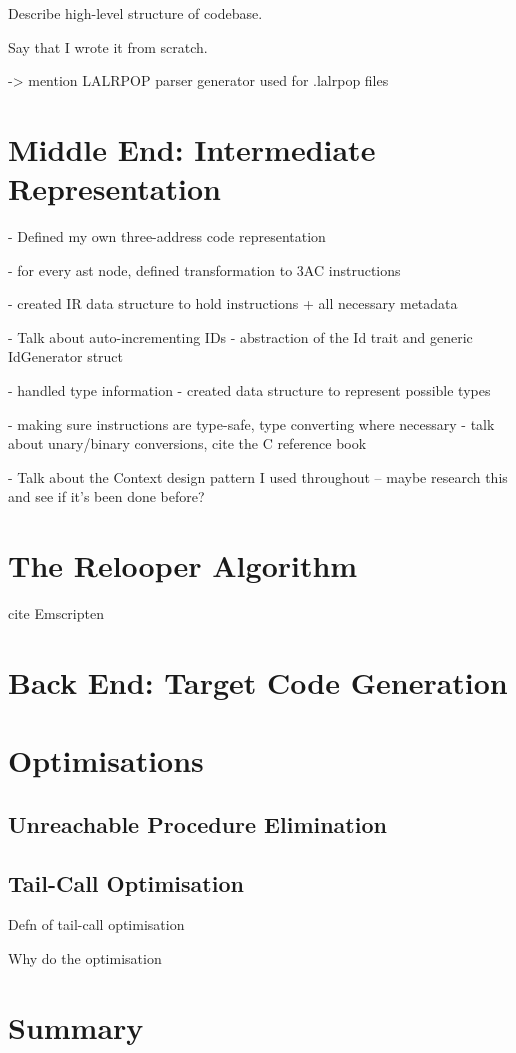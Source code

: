 \documentclass[00-main.tex]{subfiles}
\begin{document}
\begin{Comment}
Describe high-level structure of codebase.

Say that I wrote it from scratch.

-> mention LALRPOP parser generator used for .lalrpop files
\end{Comment}

\section{Middle End: Intermediate Representation}

\begin{Comment}
- Defined my own three-address code representation

- for every ast node, defined transformation to 3AC instructions

- created IR data structure to hold instructions + all necessary metadata

- Talk about auto-incrementing IDs - abstraction of the Id trait and generic IdGenerator struct

- handled type information - created data structure to represent possible types

- making sure instructions are type-safe, type converting where necessary - talk about unary/binary conversions, cite the C reference book

- Talk about the Context design pattern I used throughout -- maybe research this and see if it's been done before?
\end{Comment}

\section{The Relooper Algorithm}

\begin{Comment}
cite Emscripten \cite{emscripten}
\end{Comment}

\section{Back End: Target Code Generation}


\section{Optimisations}

\subsection{Unreachable Procedure Elimination}

\subsection{Tail-Call Optimisation}

\begin{Comment}
Defn of tail-call optimisation

Why do the optimisation
\end{Comment}

\section{Summary}
\end{document}
